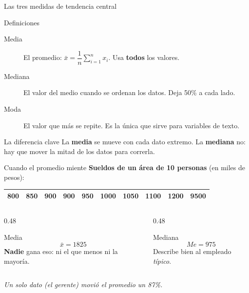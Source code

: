 \documentclass[aspectratio=169,10pt]{beamer}
\begin{document}
\begin{frame}{Las tres medidas de tendencia central}
  \begin{block}{Definiciones}
    \begin{description}
      \item[Media] El promedio: $\bar{x} = \dfrac{1}{n}\sum_{i=1}^{n} x_i$. Usa \textbf{todos} los valores.
      \item[Mediana] El valor del medio cuando se ordenan los datos. Deja 50\% a cada lado.
      \item[Moda] El valor que más se repite. Es la única que sirve para variables de texto.
    \end{description}
  \end{block}
  \vspace{0.3em}
  \begin{alertblock}{La diferencia clave}
    La \textbf{media} se mueve con cada dato extremo. La \textbf{mediana} no: hay que mover la mitad
    de los datos para correrla.
  \end{alertblock}
\end{frame}

\begin{frame}{Cuando el promedio miente}
  \textbf{Sueldos de un área de 10 personas} (en miles de pesos):
  \vspace{0.4em}
  \begin{center}
  \small
  \begin{tabular}{cccccccccc}
    \toprule
    800 & 850 & 900 & 900 & 950 & 1000 & 1050 & 1100 & 1200 & \textbf{9500} \\
    \bottomrule
  \end{tabular}
  \end{center}
  \vspace{0.6em}
  \begin{columns}[T]
    \begin{column}{0.48\textwidth}
      \begin{block}{Media}
        \[ \bar{x} = 1825 \]
        \textbf{Nadie} gana eso: ni el que menos ni la mayoría.
      \end{block}
    \end{column}
    \begin{column}{0.48\textwidth}
      \begin{block}{Mediana}
        \[ Me = 975 \]
        Describe bien al empleado \emph{típico}.
      \end{block}
    \end{column}
  \end{columns}
  \vspace{0.5em}
  \begin{center}
  \emph{Un solo dato (el gerente) movió el promedio un 87\%.}
  \end{center}
\end{frame}
\end{document}
